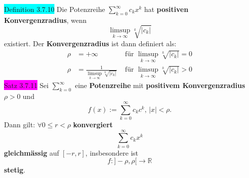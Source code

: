\documentclass[landscape, 10pt]{article}
\newcommand{\R}{\mathbb{R}}
\begin{document}
\begin{multicols}{3}
              \colorbox{cyan}{Definition 3.7.10} 
                     Die Potenzreihe 
                     \textcolor{NavyBlue}{
                     $\sum_{k=0}^\infty c_kx^k$}
                     hat \textbf{positiven Konvergenzradius}, 
                     wenn 
                     \begin{equation*}
                            \limsup\limits_{k\to\infty}\sqrt[k]{|c_k|}
                     \end{equation*}
                     existiert. 
                     Der \textbf{Konvergenzradius} 
                     ist dann definiert als: 
                     \begin{align*}
                            \rho&=+\infty 
                            &\text{ für } 
                            \limsup\limits_{k\to\infty}
                            \sqrt[k]{|c_k|}=0 \\
                            \rho&=\frac{1}{\limsup
                            \limits_{k\to\infty}\sqrt[k]{|c_k|}}
                            &\text{ für }
                            \limsup\limits_{k\to\infty}
                            \sqrt[k]{|c_k|}>0
                     \end{align*}
              \colorbox{magenta}{Satz 3.7.11} 
                     Sei \textcolor{NavyBlue}{
                     $\sum_{k=0}^\infty$}
                     eine \textbf{Potenzreihe} mit 
                     \textbf{positivem Konvergenzradius} 
                     \textcolor{NavyBlue}{$\rho>0$} und 
                     \begin{equation*}
                            f(x):=\sum_{k=0}^\infty 
                            c_kc^k,\,|x|<\rho.
                     \end{equation*}
                     Dann gilt: 
                     \textcolor{NavyBlue}{
                     $\forall0\leqslant r<\rho$} 
                     \textbf{konvergiert} 
                     \begin{equation*}
                         \sum_{k=0}^\infty c_kx^k   
                     \end{equation*}
                     \textbf{gleichmässig} auf 
                     \textcolor{NavyBlue}{$[-r,r]$}, 
                     insbesondere ist 
                     \begin{equation*}
                         f:]-\rho,\rho[\longrightarrow\R   
                     \end{equation*}
                     \textbf{stetig}.

\end{multicols}
\end{document}
